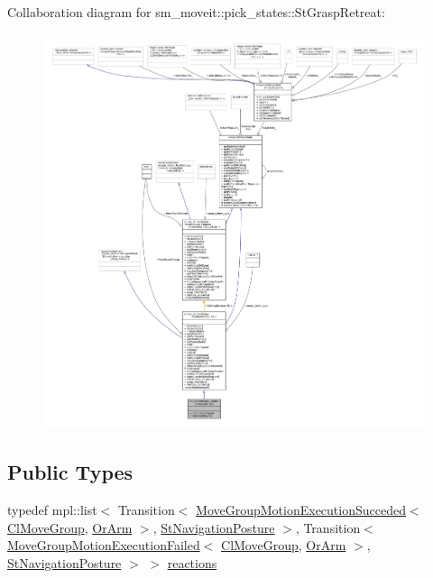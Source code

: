 Collaboration diagram for sm\+\_\+moveit\+:\+:pick\+\_\+states\+:\+:St\+Grasp\+Retreat\+:
\nopagebreak
\begin{figure}[H]
\begin{center}
\leavevmode
\includegraphics[width=350pt]{structsm__moveit_1_1pick__states_1_1StGraspRetreat__coll__graph}
\end{center}
\end{figure}
\subsection*{Public Types}
\begin{DoxyCompactItemize}
\item 
typedef mpl\+::list$<$ Transition$<$ \hyperlink{structmoveit__z__client_1_1MoveGroupMotionExecutionSucceded}{Move\+Group\+Motion\+Execution\+Succeded}$<$ \hyperlink{classmoveit__z__client_1_1ClMoveGroup}{Cl\+Move\+Group}, \hyperlink{classsm__moveit_1_1OrArm}{Or\+Arm} $>$, \hyperlink{structsm__moveit_1_1pick__states_1_1StNavigationPosture}{St\+Navigation\+Posture} $>$, Transition$<$ \hyperlink{structmoveit__z__client_1_1MoveGroupMotionExecutionFailed}{Move\+Group\+Motion\+Execution\+Failed}$<$ \hyperlink{classmoveit__z__client_1_1ClMoveGroup}{Cl\+Move\+Group}, \hyperlink{classsm__moveit_1_1OrArm}{Or\+Arm} $>$, \hyperlink{structsm__moveit_1_1pick__states_1_1StNavigationPosture}{St\+Navigation\+Posture} $>$ $>$ \hyperlink{structsm__moveit_1_1pick__states_1_1StGraspRetreat_a3427099143b52dbfc165e01dbe2e81ce}{reactions}
\end{DoxyCompactItemize}
